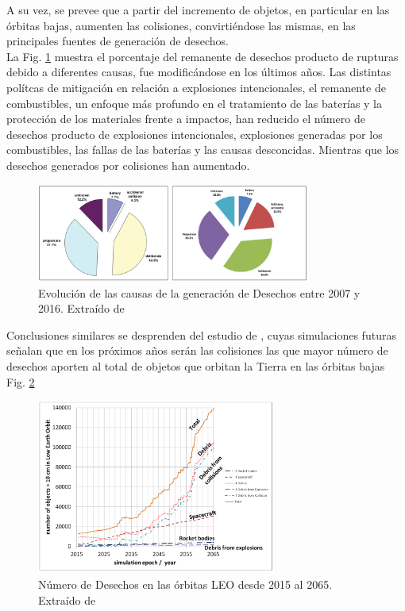 A su vez, se prevee que a partir del incremento de objetos, en particular en las \'orbitas bajas, aumenten las colisiones, convirti\'endose las mismas, en las principales fuentes de generaci\'on de desechos.\\ 

La Fig. \ref{fig:causadesechos} muestra el porcentaje del remanente de desechos producto de rupturas debido a diferentes causas, fue modific\'andose en los \'ultimos a\~nos. Las distintas pol\'itcas de mitigaci\'on en relaci\'on a explosiones intencionales, el remanente de combustibles, un enfoque m\'as profundo en el tratamiento de las bater\'ias y la protecci\'on de los materiales frente a impactos, han reducido el n\'umero de desechos producto de explosiones intencionales, explosiones generadas por los combustibles, las fallas de las bater\'ias y  las causas desconcidas. Mientras que los desechos generados por colisiones han aumentado.\\

\begin{figure}[!h]
  \centering
  \includegraphics[width=0.8\textwidth]{imagenes/breakupsQNews}
  \caption[Evoluci\'on de las causas de la generaci\'on de Desechos]{Evoluci\'on de las causas de la generaci\'on de Desechos entre 2007 y 2016. Extra\'ido de \citep{ODQNum}}
  \label{fig:causadesechos}
\end{figure}

Conclusiones similares se desprenden del estudio de \citep{karacalioglu2016impact}, cuyas simulaciones futuras se\~nalan que en los pr\'oximos a\~nos ser\'an las colisiones las que mayor n\'umero de desechos aporten al total de objetos que orbitan la Tierra en las \'orbitas bajas Fig. \ref{fig:debriscollision}\\

\begin{figure}[!h]
  \centering
  \includegraphics[width=0.7\textwidth]{imagenes/debriscollision}
  \caption[N\'umero de Desechos en las \'orbitas LEO desde 2015 al 2065]{N\'umero de Desechos en las \'orbitas LEO desde 2015 al 2065. Extra\'ido de \citep{karacalioglu2016impact}}
  \label{fig:debriscollision}
\end{figure}

